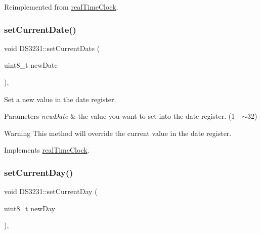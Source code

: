 Reimplemented from \mbox{\hyperlink{classreal_time_clock_af9b7db85f78d01060772bdb3b397ea3c}{real\+Time\+Clock}}.

\mbox{\label{class_d_s3231_a597a0d5cb33f8b60f81dba9050ca1363}} 
\subsubsection{\texorpdfstring{set\+Current\+Date()}{setCurrentDate()}}
{\footnotesize\ttfamily void D\+S3231\+::set\+Current\+Date (\begin{DoxyParamCaption}\item[{uint8\+\_\+t}]{new\+Date }\end{DoxyParamCaption})\hspace{0.3cm}{\ttfamily [override]}, {\ttfamily [virtual]}}



Set a new value in the date register. 


\begin{DoxyParams}{Parameters}
{\em new\+Date} & the value you want to set into the date register. (1 -\/ $\sim$32) \\
\hline
\end{DoxyParams}
\begin{DoxyWarning}{Warning}
This method will override the current value in the date register. 
\end{DoxyWarning}


Implements \mbox{\hyperlink{classreal_time_clock_a7db563a518ae7b87ca6d77860906e517}{real\+Time\+Clock}}.

\mbox{\label{class_d_s3231_ae43a887db6022008c066a257acd68ae8}} 
\subsubsection{\texorpdfstring{set\+Current\+Day()}{setCurrentDay()}}
{\footnotesize\ttfamily void D\+S3231\+::set\+Current\+Day (\begin{DoxyParamCaption}\item[{uint8\+\_\+t}]{new\+Day }\end{DoxyParamCaption})\hspace{0.3cm}{\ttfamily [override]}, {\ttfamily [virtual]}}




